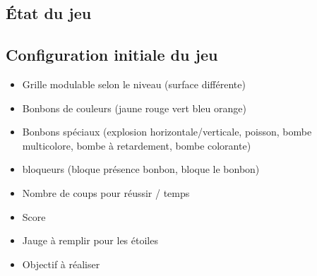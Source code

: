 \subsection{État du jeu}

\subsection{Configuration initiale du jeu}
\begin{itemize}
        \item 
        Grille modulable selon le niveau (surface différente)
        \item 
        Bonbons de couleurs (jaune rouge vert bleu orange)
        \item 
        Bonbons spéciaux (explosion horizontale/verticale, poisson, bombe multicolore, bombe à retardement, bombe colorante)
        \item 
        bloqueurs (bloque présence bonbon, bloque le bonbon)
        \item 
        Nombre de coups pour réussir / temps
        \item 
        Score
        \item 
        Jauge à remplir pour les étoiles
        \item 
        Objectif à réaliser
\end{itemize}


